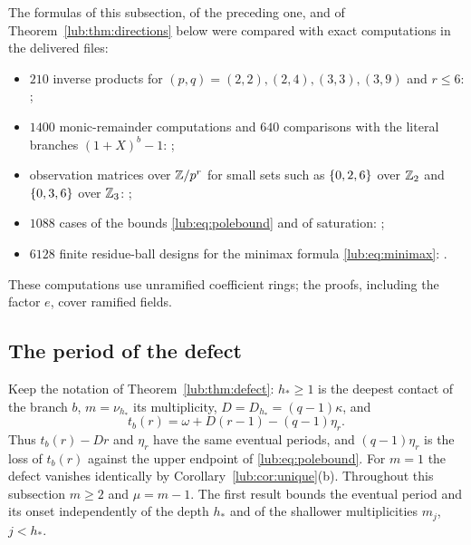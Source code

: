 \begin{remark}\label{lub:rem:checks}
The formulas of this subsection, of the preceding one, and of
Theorem~\ref{lub:thm:directions} below were compared with exact computations in the
delivered files:
\begin{itemize}[nosep]
\raggedright
\item $210$ inverse products for $(p,q)=(2,2),(2,4),(3,3),(3,9)$ and $r\le6$:
;
\item $1400$ monic-remainder computations and $640$ comparisons with the literal branches
$(1+X)^b-1$:
;
\item observation matrices over $\mathbb{Z}/p^r$ for small sets such as $\{0,2,6\}$ over $\mathbb{Z}_2$
and $\{0,3,6\}$ over $\mathbb{Z}_3$:
;
\item $1088$ cases of the bounds \eqref{lub:eq:polebound} and of saturation:
;
\item $6128$ finite residue-ball designs for the minimax formula \eqref{lub:eq:minimax}:
.
\end{itemize}
These computations use unramified coefficient rings; the proofs, including the factor $e$,
cover ramified fields.
\end{remark}

\subsection{The period of the defect}\label{lub:ssec:period}
\begingroup\raggedright{}\endgroup

Keep the notation of Theorem~\ref{lub:thm:defect}: $h_*\ge1$ is the deepest contact of the
branch $b$, $m=\nu_{h_*}$ its multiplicity, $D=D_{h_*}=(q-1)\kappa$, and
\[
 t_b(r)=\omega+D(r-1)-(q-1)\eta_r .
\]
Thus $t_b(r)-Dr$ and $\eta_r$ have the same eventual periods, and $(q-1)\eta_r$ is the loss of
$t_b(r)$ against the upper endpoint of \eqref{lub:eq:polebound}. For $m=1$ the defect vanishes
identically by Corollary~\ref{lub:cor:unique}(b). Throughout this subsection $m\ge2$ and
$\mu=m-1$. The first result bounds the eventual period and its onset independently of the
depth $h_*$ and of the shallower multiplicities $m_j$, $j<h_*$.

